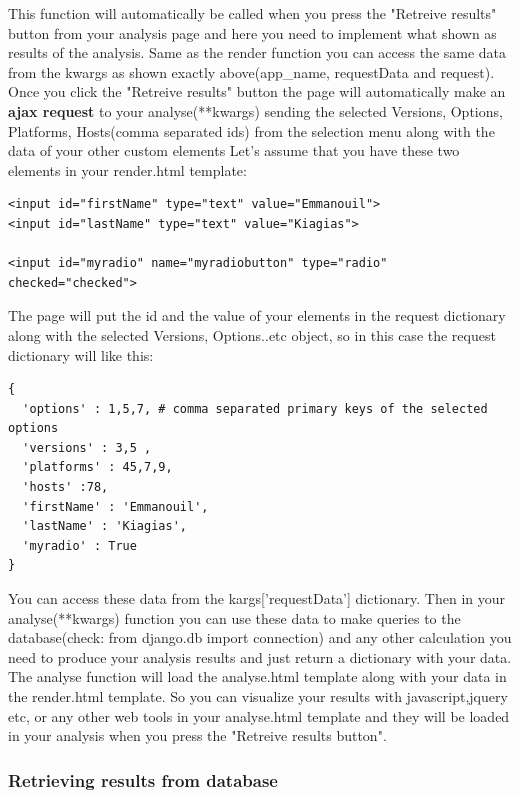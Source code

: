 \documentclass{lhcbnote}
\begin{document}
This function will automatically  be called when you press the "Retreive results" button from your analysis page 
and here you need to implement what shown as results of the analysis.  
Same as the render function you can access the same data from the kwargs as shown exactly above(app\_name, requestData and request). 
Once you click the "Retreive results" button the page will automatically make an {\bf ajax request} to your analyse(**kwargs) sending the 
selected Versions, Options, Platforms, Hosts(comma separated ids) from the selection menu along with the data of your other custom elements
Let's assume that you have these two elements in your render.html template:

\begin{verbatim}
<input id="firstName" type="text" value="Emmanouil">
<input id="lastName" type="text" value="Kiagias">

<input id="myradio" name="myradiobutton" type="radio" checked="checked">
\end{verbatim}

The page will put the id and the value of your elements in the request dictionary along with the selected Versions, Options..etc object, so in this case the request dictionary will like this:

\begin{verbatim}
{
  'options' : 1,5,7, # comma separated primary keys of the selected options 
  'versions' : 3,5 , 
  'platforms' : 45,7,9,
  'hosts' :78,
  'firstName' : 'Emmanouil',
  'lastName' : 'Kiagias',
  'myradio' : True
} 
\end{verbatim} 

You can access these data from the kargs['requestData'] dictionary. Then in your analyse(**kwargs) function you can use these data to make queries to the database(check: from django.db import connection)
and any other calculation you need to produce your analysis results and just return a dictionary with your data. The analyse function will load the analyse.html template along with your data in the render.html template.
So you can visualize your results with javascript,jquery etc, or any other web tools in your analyse.html template and they will be loaded in your analysis when you press the "Retreive results button".

\subsubsection{Retrieving results from database}
\end{document}
